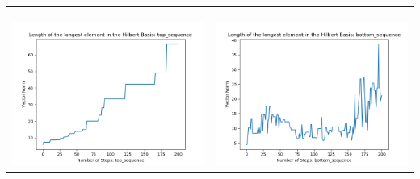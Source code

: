 \documentclass[10pt]{article}
\begin{document}
\begin{tabular}{c|c}
\begin{minipage}{.45\textwidth}
\end{minipage} \\ \\
\hline \\\begin{minipage}{.45\textwidth}
\includegraphics[width=\textwidth]{"DATA/5d/6 generators 2 bound G/top_sequence LENGTH"}
\end{minipage} &
\begin{minipage}{.45\textwidth}
\includegraphics[width=\textwidth]{"DATA/5d/6 generators 2 bound G bottomup/bottom_sequence LENGTH"}
\end{minipage}
\end{tabular}
\end{document}
